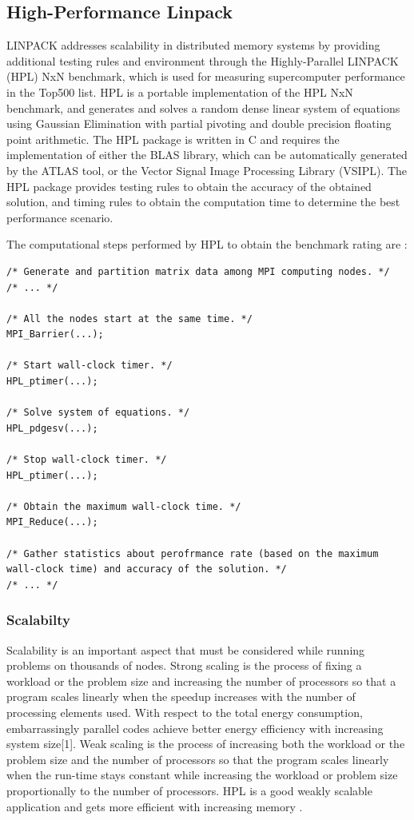 \documentclass[10pt,twocolumn]{article}
\begin{document}
\subsection{High-Performance Linpack}
LINPACK addresses scalability in distributed memory systems by providing additional testing rules and environment through the Highly-Parallel LINPACK (HPL) NxN benchmark, which is used for measuring supercomputer performance in the Top500 list. HPL is a portable implementation of the HPL NxN benchmark, and generates and solves a random dense linear system of equations using Gaussian Elimination with partial pivoting and double precision floating point arithmetic. The HPL package is written in C and requires the implementation of either the BLAS library, which can be automatically generated by the ATLAS tool, or the Vector Signal Image Processing Library (VSIPL). The HPL package provides testing rules to obtain the accuracy of the obtained solution, and timing rules to obtain the computation time to determine the best performance scenario.  

The computational steps performed by HPL to obtain the benchmark rating are :

\begin{lstlisting}
/* Generate and partition matrix data among MPI computing nodes. */
/* ... */

/* All the nodes start at the same time. */
MPI_Barrier(...);

/* Start wall-clock timer. */
HPL_ptimer(...);

/* Solve system of equations. */
HPL_pdgesv(...);

/* Stop wall-clock timer. */
HPL_ptimer(...);

/* Obtain the maximum wall-clock time. */
MPI_Reduce(...);

/* Gather statistics about perofrmance rate (based on the maximum wall-clock time) and accuracy of the solution. */
/* ... */

\end{lstlisting}


\subsubsection{Scalabilty}
Scalability is an important aspect that must be considered while running problems on thousands of nodes. Strong scaling is the process of fixing a workload or the problem size and increasing the number of processors so that a program scales linearly when the speedup increases with the number of processing elements used. With respect to the total energy consumption, embarrassingly parallel codes achieve better energy efficiency with increasing system size[1]. Weak scaling is the process of increasing both the workload or the problem size and the number of processors so that the program scales linearly when the run-time stays constant while increasing the workload or problem size proportionally to the number of processors. HPL is a good weakly scalable application and gets more efficient with increasing memory \cite{tibidabo}.
\end{document}
